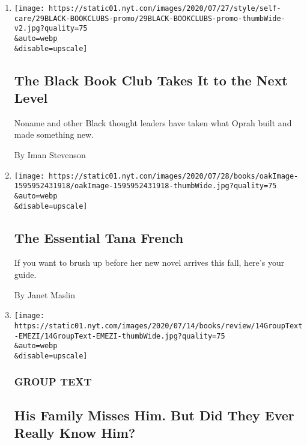 \begin{enumerate}
\def\labelenumi{\arabic{enumi}.}
\item
  \href{/2020/07/29/style/self-care/black-book-clubs.html}{}

  \texttt{[image: https://static01.nyt.com/images/2020/07/27/style/self-care/29BLACK-BOOKCLUBS-promo/29BLACK-BOOKCLUBS-promo-thumbWide-v2.jpg?quality=75\\\&auto=webp\\\&disable=upscale]}

  \hypertarget{the-black-book-club-takes-it-to-the-next-level}{%
  \subsection{The Black Book Club Takes It to the Next
  Level}\label{the-black-book-club-takes-it-to-the-next-level}}

  Noname and other Black thought leaders have taken what Oprah built and
  made something new.

  By Iman Stevenson
\item
  \href{/2020/07/29/books/the-essential-tana-french.html}{}

  \texttt{[image: https://static01.nyt.com/images/2020/07/28/books/oakImage-1595952431918/oakImage-1595952431918-thumbWide.jpg?quality=75\\\&auto=webp\\\&disable=upscale]}

  \hypertarget{the-essential-tana-french}{%
  \subsection{The Essential Tana
  French}\label{the-essential-tana-french}}

  If you want to brush up before her new novel arrives this fall, here's
  your guide.

  By Janet Maslin
\item
  \href{/2020/07/28/books/death-vivek-oji-akwaeke-emezi-group-text.html}{}

  \texttt{[image: https://static01.nyt.com/images/2020/07/14/books/review/14GroupText-EMEZI/14GroupText-EMEZI-thumbWide.jpg?quality=75\\\&auto=webp\\\&disable=upscale]}

  \hypertarget{group-text}{%
  \subsubsection{GROUP TEXT}\label{group-text}}

  \hypertarget{his-family-misses-him-but-did-they-ever-really-know-him}{%
  \subsection{His Family Misses Him. But Did They Ever Really Know
  Him?}\label{his-family-misses-him-but-did-they-ever-really-know-him}}


\end{enumerate}

